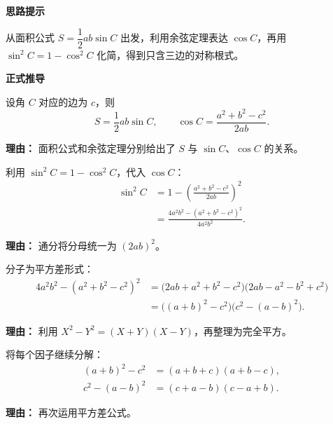 \begin{proofbox}
	\textbf{\textcolor{CProof}{思路提示}}

	从面积公式 $S=\dfrac12 ab\sin C$ 出发，利用余弦定理表达 $\cos C$，再用 $\sin^2 C=1-\cos^2 C$ 化简，得到只含三边的对称根式。

	\medskip
	\textbf{\textcolor{CProof}{正式推导}}

	\begin{description}[style=nextline, leftmargin=2.8em, labelsep=0.5em, itemsep=0.55em]
		\item[\textbf{步骤一（面积与余弦）：}]
		      设角 $C$ 对应的边为 $c$，则
		      \[
			      S = \frac12 ab\sin C,
			      \qquad
			      \cos C = \frac{a^2+b^2-c^2}{2ab}.
		      \]
		      \par\textbf{理由：} 面积公式和余弦定理分别给出了 $S$ 与 $\sin C$、$\cos C$ 的关系。

		\item[\textbf{步骤二（表达正弦平方）：}]
		      利用 $\sin^2 C = 1-\cos^2 C$，代入 $\cos C$：
		      \[
			      \begin{aligned}
				      \sin^2 C
				       & = 1 - \left(\frac{a^2+b^2-c^2}{2ab}\right)^2 \\
				       & = \frac{4a^2b^2 - (a^2+b^2-c^2)^2}{4a^2b^2}.
			      \end{aligned}
		      \]
		      \par\textbf{理由：} 通分将分母统一为 $(2ab)^2$。

		\item[\textbf{步骤三（平方差分解）：}]
		      分子为平方差形式：
		      \[
			      \begin{aligned}
				      4a^2b^2 - (a^2+b^2-c^2)^2
				       & = \bigl(2ab+a^2+b^2-c^2\bigr)\bigl(2ab-a^2-b^2+c^2\bigr) \\
				       & = \bigl((a+b)^2-c^2\bigr)\bigl(c^2-(a-b)^2\bigr).
			      \end{aligned}
		      \]
		      \par\textbf{理由：} 利用 $X^2-Y^2=(X+Y)(X-Y)$，再整理为完全平方。

		\item[\textbf{步骤四（继续分解）：}]
		      将每个因子继续分解：
		      \[
			      \begin{aligned}
				      (a+b)^2-c^2 & = (a+b+c)(a+b-c), \\
				      c^2-(a-b)^2 & = (c+a-b)(c-a+b).
			      \end{aligned}
		      \]
		      \par\textbf{理由：} 再次运用平方差公式。


\end{description}
\end{proofbox}
